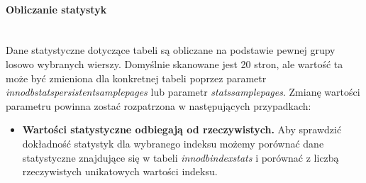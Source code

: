 \paragraph{Obliczanie statystyk}\mbox{}\\
Dane statystyczne dotyczące tabeli są obliczane na podstawie pewnej grupy losowo wybranych wierszy. Domyślnie skanowane jest 20 stron, ale wartość ta może być zmieniona dla konkretnej tabeli poprzez parametr \textit{innodb\textunderscore stats\textunderscore persistent\textunderscore sample\textunderscore pages} lub parametr \textit{stats\textunderscore sample\textunderscore pages}. Zmianę wartości parametru powinna zostać rozpatrzona w następujących przypadkach:
\begin{itemize}
	\item \textbf{Wartości statystyczne odbiegają od rzeczywistych.} \linebreak
	Aby sprawdzić dokładność statystyk dla wybranego indeksu możemy porównać dane statystyczne znajdujące się w tabeli \textit{innodb\textunderscore index\textunderscore stats} i porównać z liczbą rzeczywistych unikatowych wartości indeksu.
	

\end{itemize}
